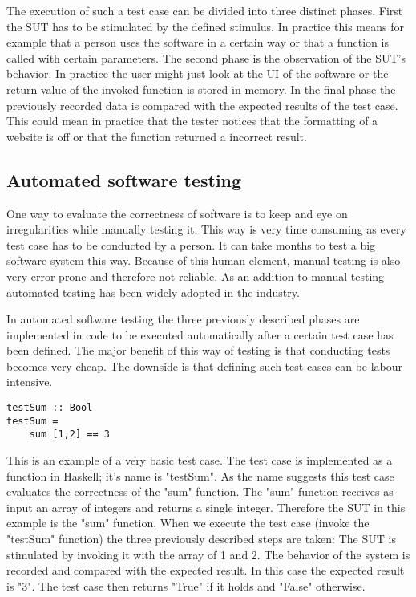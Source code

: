 \documentclass[a4paper, 12pt]{article} %
\begin{document}
The execution of such a test case can be divided into three distinct phases. First the SUT has to be stimulated by the defined stimulus. In practice this means for example that a person uses the software in a certain way or that a function is called with certain parameters. The second phase is the observation of the SUT's behavior. In practice the user might just look at the UI of the software or the return value of the invoked function is stored in memory. In the final phase the previously recorded data is compared with the expected results of the test case. This could mean in practice that the tester notices that the formatting of a website is off or that the function returned a incorrect result.

\subsection{Automated software testing}

One way to evaluate the correctness of software is to keep and eye on irregularities while manually testing it. This way is very time consuming as every test case has to be conducted by a person. It can take months to test a big software system this way\cite{Arts06}. Because of this human element, manual testing is also very error prone and therefore not reliable. As an addition to manual testing automated testing has been widely adopted in the industry.

In automated software testing the three previously described phases are implemented in code to be executed automatically after a certain test case has been defined. The major benefit of this way of testing is that conducting tests becomes very cheap. The downside is that defining such test cases can be labour intensive.

\begin{verbatim}
testSum :: Bool
testSum = 
    sum [1,2] == 3
\end{verbatim}

This is an example of a very basic test case. The test case is implemented as a function in Haskell; it's name is "testSum". As the name suggests this test case evaluates the correctness of the "sum" function. The "sum" function receives as input an array of integers and returns a single integer. Therefore the SUT in this example is the "sum" function. When we execute the test case (invoke the "testSum" function) the three previously
described steps are taken: The SUT is stimulated by invoking it with the array of 1 and 2. The behavior of the system is recorded and compared with the expected result. In this case the expected result is "3". The test case then returns "True" if it holds and "False" otherwise. 
\end{document}
